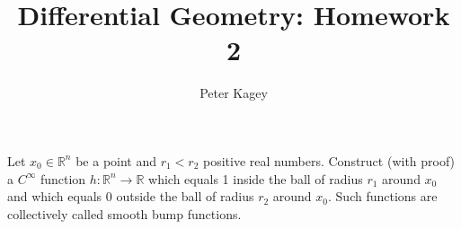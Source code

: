 \documentclass{article}
\newenvironment{problem}[2][Problem]{\begin{trivlist}
\item[\hskip \labelsep {\bfseries #1}\hskip \labelsep {\bfseries #2.}]}{\end{trivlist}}
\begin{document}
\title{Differential Geometry: Homework 2}
\author{Peter Kagey}

\maketitle

\begin{problem}{1}
  Let $x_0 \in \mathbb{R}^n$ be a point and $r_1 < r_2$ positive real numbers.
  Construct (with proof) a $C^\infty$ function
  $h\colon \mathbb{R}^n \rightarrow \mathbb{R}$ which equals 1 inside the ball
  of radius $r_1$ around $x_0$ and which equals $0$ outside the ball of radius
  $r_2$ around $x_0$. Such functions are collectively called smooth bump
  functions.
\end{problem}
\end{document}
